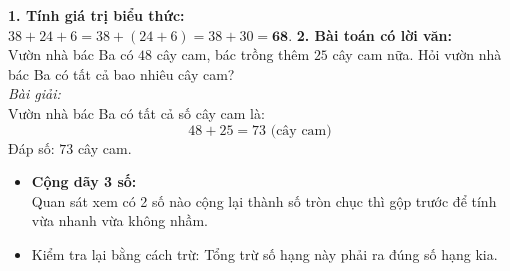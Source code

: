 \documentclass[11pt,a4paper]{article}
\begin{document}
\vspace{-1.5mm}
\noindent
\begin{minipage}[t]{0.49\textwidth}\vspace{0pt}
\begin{tcolorbox}[
  enhanced,
  colback=green!4!white,
  colframe=green!60!black,
  arc=2mm, boxrule=0.8pt,
  left=2mm, right=2mm, top=1.8mm, bottom=1.8mm,
  title={\footnotesize\bfseries\color{white}\faCheckCircle\ 4. Ví dụ thực hành chuẩn mực}
]
{\footnotesize
\textbf{1. Tính giá trị biểu thức:}\\
$38 + 24 + 6 = 38 + (24 + 6) = 38 + 30 = \mathbf{68}$.
\textbf{2. Bài toán có lời văn:}\\
Vườn nhà bác Ba có $48$ cây cam, bác trồng thêm $25$ cây cam nữa. Hỏi vườn nhà bác Ba có tất cả bao nhiêu cây cam?\\
\textit{Bài giải:}\\
Vườn nhà bác Ba có tất cả số cây cam là:
$$48 + 25 = 73\text{ (cây cam)}$$
Đáp số: $73$ cây cam.
}
\end{tcolorbox}
\end{minipage}
\hfill
\begin{minipage}[t]{0.49\textwidth}\vspace{0pt}
\begin{tcolorbox}[
  enhanced,
  colback=red!4!white,
  colframe=red!75!black,
  arc=2mm, boxrule=0.8pt,
  left=2mm, right=2mm, top=1.8mm, bottom=1.8mm,
  title={\footnotesize\bfseries\color{white}\faExclamationTriangle\ 5. Mẹo tránh bẫy trắc nghiệm}
]
{\footnotesize
\begin{itemize}\setlength{\itemsep}{1pt}\setlength{\leftskip}{-2.5mm}
  \item \textbf{Cộng dãy 3 số:}\\
  Quan sát xem có 2 số nào cộng lại thành số tròn chục thì gộp trước để tính vừa nhanh vừa không nhầm.
  \item Kiểm tra lại bằng cách trừ: Tổng trừ số hạng này phải ra đúng số hạng kia.
\end{itemize}
}
\end{tcolorbox}
\end{minipage}
\end{document}
